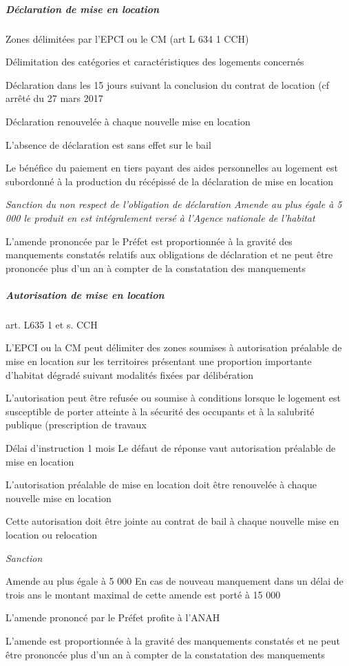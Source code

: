 \documentclass[10pt,a4paper,twoside]{article}
\newenvironment*{focus}[1][]{\medskip \textbf{#1} \newline \itshape}{}
\begin{document}
				\subparagraph{Déclaration de mise en location}

					Zones délimitées par l’EPCI ou le CM (art L 634 1 CCH)

					Délimitation des catégories et caractéristiques des logements
					concernés

					Déclaration dans les 15 jours suivant la conclusion du contrat
					de location (cf arrêté du 27 mars 2017

					Déclaration renouvelée à chaque nouvelle mise en location

					L'absence de déclaration est sans effet sur le bail

					Le bénéfice du paiement en tiers payant des aides
					personnelles au logement est subordonné à la production du
					récépissé de la déclaration de mise en location

					\begin{focus}{Sanction du non respect de l’obligation de déclaration}
						Amende au plus égale à 5 000 le produit en est
						intégralement versé à l'Agence nationale de l'habitat

						L'amende prononcée par le Préfet est proportionnée à la
						gravité des manquements constatés relatifs aux obligations
						de déclaration et ne peut être prononcée plus d'un an à
						compter de la constatation des manquements
					\end{focus}

				\subparagraph{Autorisation de mise en location} art. L635 1 et s. CCH

					L’EPCI ou la CM peut délimiter des zones soumises à
					autorisation préalable de mise en location sur les territoires
					présentant une proportion importante d'habitat dégradé
					suivant modalités fixées par délibération

					L’autorisation peut être refusée ou soumise à conditions
					lorsque le logement est susceptible de porter atteinte à la
					sécurité des occupants et à la salubrité publique
					(prescription de travaux

					Délai d’instruction 1 mois Le défaut de réponse
					vaut autorisation préalable de mise en location

					L'autorisation préalable de mise en location doit être
					renouvelée à chaque nouvelle mise en location

					Cette autorisation doit être jointe au contrat de bail
					à chaque nouvelle mise en location ou relocation

					\begin{focus}{Sanction}

						Amende au plus égale à 5 000 En cas de
						nouveau manquement dans un délai de trois ans le
						montant maximal de cette amende est porté à 15
						000

						L’amende prononcé par le Préfet profite à l’ANAH

						L'amende est proportionnée à la gravité des
						manquements constatés et ne peut être prononcée
						plus d'un an à compter de la constatation des
						manquements
					\end{focus}
\end{document}
